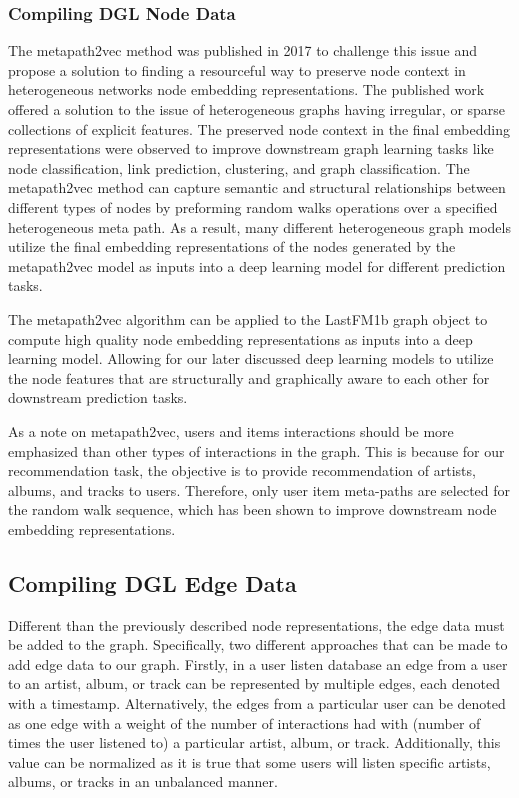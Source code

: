 \subsubsection{Compiling DGL Node Data}

The metapath2vec method \cite{dong2017metapath2vec} was published in 2017 to challenge this issue and propose a solution to finding a resourceful way to preserve node context in heterogeneous networks node embedding representations. The published work offered a solution to the issue of heterogeneous graphs having irregular, or sparse collections of explicit features. The preserved node context in the final embedding representations were observed to improve downstream graph learning tasks like node classification, link prediction, clustering, and graph classification. The metapath2vec method can capture semantic and structural relationships between different types of nodes by preforming random walks operations over a specified heterogeneous meta path. As a result, many different heterogeneous graph models utilize the final embedding representations of the nodes generated by the metapath2vec model as inputs into a deep learning model for different prediction tasks.  \cite{dong2017metapath2vec}



The metapath2vec algorithm can be applied to the LastFM1b graph object to compute high quality node embedding representations as inputs into a deep learning model. Allowing for our later discussed deep learning models to utilize the node features that are structurally and graphically aware to each other for downstream prediction tasks.

As a note on metapath2vec, users and items interactions should be more emphasized than other types of interactions in the graph. This is because for our recommendation task, the objective is to provide recommendation of artists, albums, and tracks to users. Therefore, only user item meta-paths are selected for the random walk sequence, which has been shown to improve downstream node embedding representations. \cite{hgRepAndApp2022}


\subsection{Compiling DGL Edge Data}
Different than the previously described node representations, the edge data must be added to the graph. Specifically, two different approaches that can be made to add edge data to our graph. Firstly, in a user listen database an edge from a user to an artist, album, or track can be represented by multiple edges, each denoted with a timestamp. Alternatively, the edges from a particular user can be denoted as one edge with a weight of the number of interactions had with (number of times the user listened to) a particular artist, album, or track. Additionally, this value can be normalized as it is true that some users will listen specific artists, albums, or tracks in an unbalanced manner.

